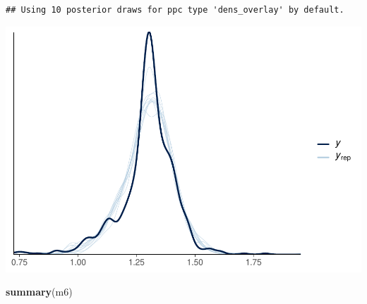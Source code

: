 \documentclass[
]{article}
\newenvironment{Shaded}{\begin{snugshade}}{\end{snugshade}}
\newcommand{\FunctionTok}[1]{\textcolor[rgb]{0.13,0.29,0.53}{\textbf{#1}}}
\newcommand{\NormalTok}[1]{#1}
\begin{document}
\begin{verbatim}
## Using 10 posterior draws for ppc type 'dens_overlay' by default.
\end{verbatim}

\includegraphics{params_analyses_files/figure-latex/unnamed-chunk-7-2.pdf}

\begin{Shaded}
\begin{Highlighting}[]
\FunctionTok{summary}\NormalTok{(m6)}
\end{Highlighting}
\end{Shaded}
\end{document}
